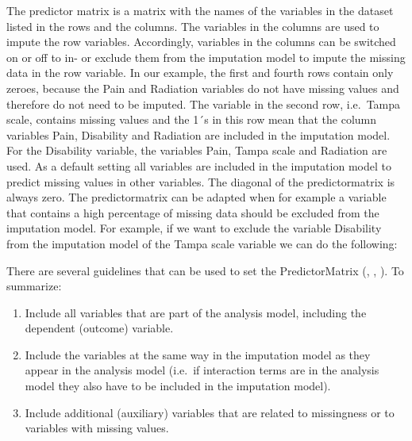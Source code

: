 \documentclass[]{book}
\newenvironment{Shaded}{\begin{snugshade}}{\end{snugshade}}
\newcommand{\KeywordTok}[1]{\textcolor[rgb]{0.13,0.29,0.53}{\textbf{#1}}}
\newcommand{\DataTypeTok}[1]{\textcolor[rgb]{0.13,0.29,0.53}{#1}}
\newcommand{\DecValTok}[1]{\textcolor[rgb]{0.00,0.00,0.81}{#1}}
\newcommand{\StringTok}[1]{\textcolor[rgb]{0.31,0.60,0.02}{#1}}
\newcommand{\OperatorTok}[1]{\textcolor[rgb]{0.81,0.36,0.00}{\textbf{#1}}}
\newcommand{\NormalTok}[1]{#1}
\providecommand{\tightlist}{%
  \setlength{\itemsep}{0pt}\setlength{\parskip}{0pt}}
\begin{document}
The predictor matrix is a matrix with the names of the variables in the
dataset listed in the rows and the columns. The variables in the columns
are used to impute the row variables. Accordingly, variables in the
columns can be switched on or off to in- or exclude them from the
imputation model to impute the missing data in the row variable. In our
example, the first and fourth rows contain only zeroes, because the Pain
and Radiation variables do not have missing values and therefore do not
need to be imputed. The variable in the second row, i.e.~Tampa scale,
contains missing values and the 1´s in this row mean that the column
variables Pain, Disability and Radiation are included in the imputation
model. For the Disability variable, the variables Pain, Tampa scale and
Radiation are used. As a default setting all variables are included in
the imputation model to predict missing values in other variables. The
diagonal of the predictormatrix is always zero. The predictormatrix can
be adapted when for example a variable that contains a high percentage
of missing data should be excluded from the imputation model. For
example, if we want to exclude the variable Disability from the
imputation model of the Tampa scale variable we can do the following:

\begin{Shaded}
\end{Shaded}

There are several guidelines that can be used to set the PredictorMatrix
(\citet{Collins2001}, \citet{VanBuuren2018}, \citet{Rubin1976}). To
summarize:

\begin{enumerate}
\def\labelenumi{\arabic{enumi}.}
\tightlist
\item
  Include all variables that are part of the analysis model, including
  the dependent (outcome) variable.
\item
  Include the variables at the same way in the imputation model as they
  appear in the analysis model (i.e.~if interaction terms are in the
  analysis model they also have to be included in the imputation model).
\item
  Include additional (auxiliary) variables that are related to
  missingness or to variables with missing values.
\end{enumerate}
\end{document}
